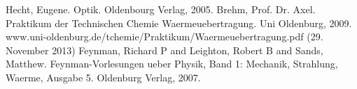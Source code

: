 \pagebreak
\begin{thebibliography}{9}
 Hecht, Eugene. Optik. Oldenbourg Verlag, 2005.
 Brehm, Prof. Dr. Axel. Praktikum der Technischen Chemie Waermeuebertragung. Uni Oldenburg, 2009. www.uni-oldenburg.de/tchemie/Praktikum/Waermeuebertragung.pdf (29. November 2013)
Feynman, Richard P and Leighton, Robert B and Sands, Matthew. Feynman-Vorlesungen ueber Physik, Band 1: Mechanik, Strahlung, Waerme, Ausgabe 5. Oldenburg Verlag, 2007.
\end{thebibliography}